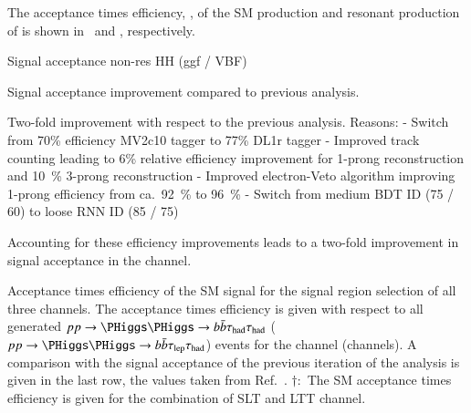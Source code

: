 The acceptance times efficiency, \AccTimesEff, of the SM \HH
production and resonant production of \HH is shown
in~ and
, respectively.

Signal acceptance non-res HH (ggf / VBF)

Signal acceptance improvement compared to previous analysis.

Two-fold improvement with respect to the previous analysis. Reasons:
- Switch from 70\% efficiency MV2c10 tagger to 77\% DL1r tagger
- Improved \tauhadvis track counting leading to 6\% relative efficiency improvement for 1-prong \tauhadvis reconstruction and \SI{10}{\percent} 3-prong \tauhadvis reconstruction
- Improved electron-Veto algorithm improving 1-prong \tauhadvis efficiency from ca.\ \SI{92}{\percent} to \SI{96}{\percent}
- Switch from medium BDT ID (75 / 60) to loose RNN ID (85 / 75)

Accounting for these efficiency improvements leads to a two-fold improvement in signal acceptance in the \hadhad channel.






\cite{duschinger}

\begin{table}[htbp]
  \centering

  \caption{Acceptance times efficiency of the SM \HH signal for the
    signal region selection of all three channels. The acceptance
    times efficiency is given with respect to all generated
    $pp \to \HH \to \bbbar\hadhad$ ($pp \to \HH \to \bbbar\lephad$)
    events for the \hadhad channel (\lephad channels). A comparison
    with the signal acceptance of the previous iteration of the
    analysis is given in the last row, the values taken from
    Ref.~\cite{HIGG-2016-16-witherratum}. $\dagger$:~The SM \HH
    acceptance times efficiency is given for the combination of
    \lephad SLT and LTT channel.}%
  \label{tab:nonres_acc_times_eff}

  
\end{table}








